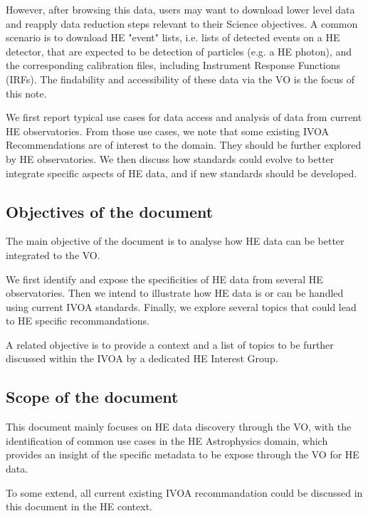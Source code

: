 \documentclass[11pt,a4paper]{ivoa}
\begin{document}
However, after browsing this data, users may want to download lower level data and reapply data reduction steps relevant to their Science objectives. A common scenario is to download HE "event" lists, i.e. lists of detected events on a HE detector, that are expected to be detection of particles (e.g. a HE photon), and the corresponding calibration files, including Instrument Response Functions (IRFs). The findability and accessibility of these data via the VO is the focus of this note.

We first report typical use cases for data access and analysis of data from current HE observatories. From those use cases, we note that some existing IVOA Recommendations are of interest to the domain. They should be further explored by HE observatories. We then discuss how standards could evolve to better integrate specific aspects of HE data, and if new standards should be developed.

\subsection{Objectives of the document}

The main objective of the document is to analyse how HE data can be better integrated to the VO.

We  first identify and expose the specificities of HE data from several HE observatories. Then we intend to illustrate how HE data is or can be handled using current IVOA standards. Finally, we explore several topics that could lead to HE specific recommandations.

A related objective is to provide a context and a list of topics to be further discussed within the IVOA by a dedicated HE Interest Group.


\subsection{Scope of the document}

This document mainly focuses on HE data discovery through the VO, with the identification of common use cases in the HE Astrophysics domain, which provides an insight of the specific metadata to be expose through the VO for HE data.

To some extend, all current existing IVOA recommandation could be discussed in this document in the HE context.



\end{document}
